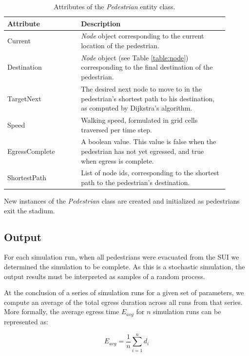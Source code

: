 \documentclass[12pt]{article}
\begin{document}
\def\arraystretch{1.5}
\begin{table}[hb!]
  \centering
    \begin{tabular}{p{0.3\linewidth}p{0.6\linewidth}}
     \hline
     Attribute & Description \\
     \hline
     Current        & \textit{Node} object corresponding to the current
                      location of the pedestrian. \\
     Destination    & \textit{Node} object (see Table \ref{table:node})
                      corresponding to the final destination of the
                      pedestrian. \\
     TargetNext     & The desired next node to move to in the pedestrian's
                      shortest path to his destination, as computed by
                      Dijkstra's algorithm. \\
     Speed          & Walking speed, formulated in grid cells traversed per
                      time step. \\
     EgressComplete & A boolean value. This value is false when the pedestrian
                      has not yet egressed, and true when egress is complete. \\
     ShortestPath & List of node ids, corresponding to the shortest path to the
                    pedestrian's destination. \\
     \hline
    \end{tabular}
    \caption{Attributes of the \textit{Pedestrian} entity class.}
  \label{table:ped}
\end{table}

New instances of the \textit{Pedestrian} class are created and initialized
as pedestrians exit the stadium.

\subsection{Output}
For each simulation run, when all pedestrians were evacuated from the SUI we
determined the simulation to be complete. As this is a stochastic simulation,
the output results must be interpreted as samples of a random process.

At the conclusion of a series of simulation runs for a given set of parameters,
we compute an average of the total egress duration across all runs from that
series. More formally, the average egress time $E_{avg}$ for $n$ simulation runs
can be represented as:

\begin{equation}
E_{avg} = \frac{1}{n}\sum\limits_{i=1}^n d_i
\end{equation}
\end{document}
